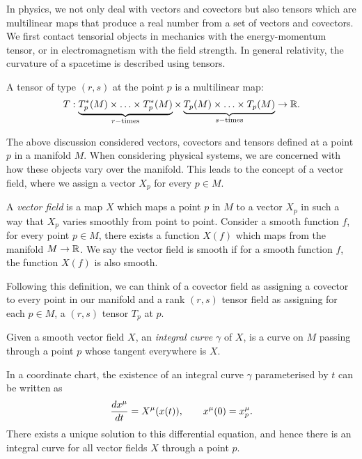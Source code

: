 In physics, we not only deal with vectors and covectors but also tensors which are multilinear maps that produce a real number from a set of vectors and covectors. We first contact tensorial objects in mechanics with the energy-momentum tensor, or in electromagnetism with the field strength. In general relativity, the curvature of a spacetime is described using tensors.
\begin{defn}
	A tensor of type $(r,s)$ at the point $p$ is a multilinear map:
	\begin{equation*}
		T: \underbrace{T_p^*(M) \times \ldots \times T_p^*(M)}_{r-\text{times}} \times \underbrace{T_p(M) \times \ldots \times T_p(M)}_{s-\text{times}} \rightarrow {\mathbb{R}}.
	\end{equation*}
\end{defn}

The above discussion considered vectors, covectors and tensors defined at a point $p$ in a manifold $M$. When considering physical systems, we are concerned with how these objects vary over the manifold. This leads to the concept of a vector field, where we assign a vector $X_p$ for every $p \in M$. 
\begin{defn}
A \emph{vector field} is a map $X$ which maps a point $p$ in $M$ to a vector $X_p$ in such a way that $X_p$ varies smoothly from point to point. Consider a smooth function $f$, for every point $p \in M$, there exists a function $X(f)$ which maps from the manifold $M \rightarrow {\mathbb{R}}$. We say the vector field is smooth if for a smooth function $f$, the function $X(f)$ is also smooth.
\end{defn}
Following this definition, we can think of a covector field as assigning a covector to every point in our manifold and a rank $(r,s)$ tensor field as assigning for each $p \in M$, a $(r,s)$ tensor $T_p$ at $p$.

\begin{defn}
	Given a smooth vector field $X$, an \emph{integral curve} $\gamma$ of $X$, is a curve on $M$ passing through a point $p$ whose tangent everywhere is $X$.
\end{defn}
In a coordinate chart, the existence of an integral curve $\gamma$ parameterised by $t$ can be written as
\begin{equation*}
	\frac{d x^\mu}{d t} = X^\mu(x(t)), \qquad x^\mu(0) = x^\mu_p.
\end{equation*}
There exists a unique solution to this differential equation, and hence there is an integral curve for all vector fields $X$ through a point $p$.


